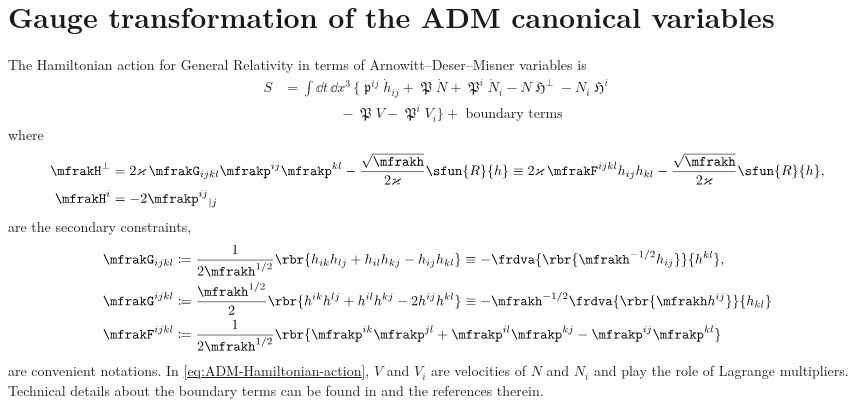 \documentclass[a4paper,11pt]{article}
\begin{document}
\section{Gauge transformation of the ADM canonical variables}


The Hamiltonian action for General Relativity in terms 
of Arnowitt--Deser--Misner variables is \cite[ch.\ 4.2.2]{Kiefer2012}
\begin{align}
S &=
\int\dd t\,\dd x^3\,\Big\{
\mfrakp^{ij}\dot{h}_{ij} + \mfrakP\dot{N} + \mfrakP^i \dot{N}_i
-N\mfrakH^\perp - N_i\mfrakH^i
\nonumber \\
&\qquad\qquad
- \mfrakP V - \mfrakP^i V_i\Big\} + \text{ boundary terms}
\label{eq:ADM-Hamiltonian-action}
\end{align}
where
\begin{align}
\mfrakH^\perp &=
2 \varkappa\,\mfrakG_{ijkl} \mfrakp^{ij}\mfrakp^{kl}
- \frac{\sqrt{\mfrakh}}{2\varkappa} \sfun{R}{h}
\equiv
2 \varkappa\,\mfrakF^{ijkl} h_{ij}h_{kl}
- \frac{\sqrt{\mfrakh}}{2\varkappa} \sfun{R}{h},
\\
\mfrakH^i &=
-2 \mfrakp^{ij}{}_{|j}
\end{align}
are the secondary constraints,
\begin{align}
\mfrakG_{ijkl} &\coloneqq \frac{1}{2\mfrakh^{1/2}}
\rbr{h_{ik}h_{lj}+h_{il}h_{kj}-h_{ij}h_{kl}}
\equiv -\frdva{\rbr{\mfrakh^{-1/2}h_{ij}}}{h^{kl}},\\
\mfrakG^{ijkl} &\coloneqq \frac{\mfrakh^{1/2}}{2}
\rbr{h^{ik}h^{lj}+h^{il}h^{kj}-2h^{ij}h^{kl}}
\equiv -\mfrakh^{-1/2}\frdva{\rbr{\mfrakh h^{ij}}}{h_{kl}}\\
\mfrakF^{ijkl} &\coloneqq \frac{1}{2\mfrakh^{1/2}}
\rbr{\mfrakp^{ik}\mfrakp^{jl}+\mfrakp^{il}\mfrakp^{kj}
-\mfrakp^{ij}\mfrakp^{kl}}
\end{align}
are convenient notations. In \cref{eq:ADM-Hamiltonian-action}, $V$ and $V_i$ 
are velocities of $N$ and $N_i$ and play the role of Lagrange multipliers. 
Technical details about the boundary terms can be found in \cite[ch.\ 
4.2]{Poisson2004} and the references therein.
\end{document}
